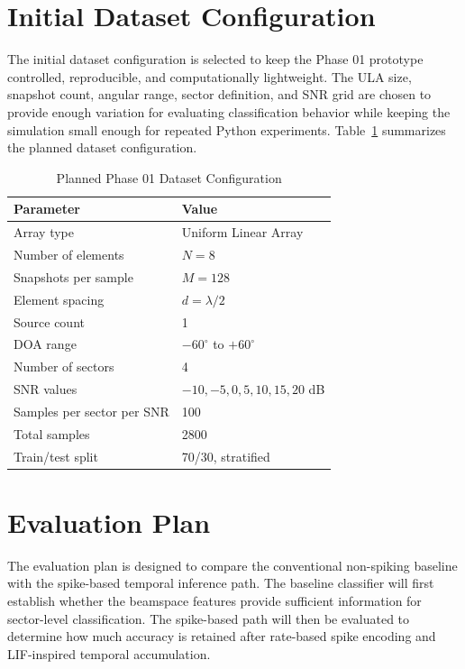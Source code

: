 \documentclass[11pt]{report}
\begin{document}
\section{Initial Dataset Configuration}

The initial dataset configuration is selected to keep the Phase 01 prototype controlled, reproducible, and computationally lightweight. The ULA size, snapshot count, angular range, sector definition, and SNR grid are chosen to provide enough variation for evaluating classification behavior while keeping the simulation small enough for repeated Python experiments. Table~\ref{tab:proposal_dataset} summarizes the planned dataset configuration.

\begin{table}[h]
\centering
\caption{Planned Phase 01 Dataset Configuration}
\label{tab:proposal_dataset}
\begin{tabular}{ll}
\toprule
Parameter & Value \\
\midrule
Array type & Uniform Linear Array \\
Number of elements & $N=8$ \\
Snapshots per sample & $M=128$ \\
Element spacing & $d=\lambda/2$ \\
Source count & 1 \\
DOA range & $-60^{\circ}$ to $+60^{\circ}$ \\
Number of sectors & 4 \\
SNR values & $-10,-5,0,5,10,15,20$ dB \\
Samples per sector per SNR & 100 \\
Total samples & 2800 \\
Train/test split & 70/30, stratified \\
\bottomrule
\end{tabular}
\end{table}

\section{Evaluation Plan}

The evaluation plan is designed to compare the conventional non-spiking baseline with the spike-based temporal inference path. The baseline classifier will first establish whether the beamspace features provide sufficient information for sector-level classification. The spike-based path will then be evaluated to determine how much accuracy is retained after rate-based spike encoding and LIF-inspired temporal accumulation.
\end{document}
